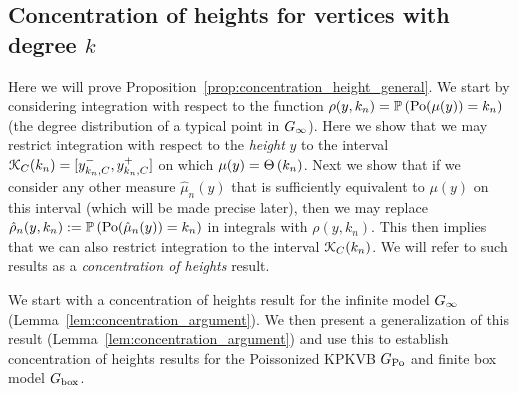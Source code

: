 \begin{appendices}
%

\section{Concentration of heights for vertices with degree $k$}\label{sec:concentration_argument}

Here we will prove Proposition~\ref{prop:concentration_height_general}. We start by considering integration with respect to the function $\rho(y,k_n) = \mathbb{P}\left({\mathrm{Po}}(\mu(y)) = k_n\right)$ (the degree distribution of a typical point in $G_{\infty}$). Here we show that we may restrict integration with respect to the \emph{height} $y$ to the interval ${\mathcal K}_C(k_n) = [y_{k_n,C}^-, y_{k_n,C}^+]$ on which $\mu(y) = \Theta\left(k_n\right)$. Next we show that if we consider any other measure $\hat{\mu}_n(y)$ that is sufficiently equivalent to $\mu(y)$ on this interval (which will be made precise later), then we may replace $\hat{\rho}_n(y,k_n) := \mathbb{P}\left({\mathrm{Po}}(\hat{\mu}_n(y)) = k_n\right)$ in integrals with $\rho(y,k_n)$. This then implies that we can also restrict integration to the interval ${\mathcal K}_C(k_n)$. We will refer to such results as a \emph{concentration of heights} result.

We start with a concentration of heights result for the infinite model $G_{\infty}$ (Lemma~\ref{lem:concentration_argument}). We then present a generalization of this result (Lemma~\ref{lem:concentration_argument}) and use this to establish concentration of heights results for the Poissonized KPKVB $G_{{\mathrm{Po}}}$ and finite box model $G_{\mathrm{box}}$. 


\end{appendices}
